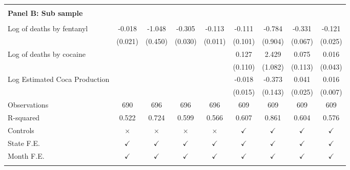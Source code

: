 \begin{tabular}{lcccccccc}
 \hline  & & & & &  &  &  &  \\ \textbf{Panel B: Sub sample} \\ & & & & & & & & \\
\rowcolor{babyblue} Log of deaths by fentanyl&      -0.018         &      -1.048\sym{*}  &      -0.305\sym{***}&      -0.113\sym{***}&      -0.111         &      -0.784         &      -0.331\sym{***}&      -0.121\sym{***}\\
                    &     (0.021)         &     (0.450)         &     (0.030)         &     (0.011)         &     (0.101)         &     (0.904)         &     (0.067)         &     (0.025)         \\
\addlinespace
Log of deaths by cocaine&                     &                     &                     &                     &       0.127         &       2.429\sym{*}  &       0.075         &       0.016         \\
                    &                     &                     &                     &                     &     (0.110)         &     (1.082)         &     (0.113)         &     (0.043)         \\
\addlinespace
Log Estimated Coca Production&                     &                     &                     &                     &      -0.018         &      -0.373\sym{**} &       0.041         &       0.016\sym{**} \\
                    &                     &                     &                     &                     &     (0.015)         &     (0.143)         &     (0.025)         &     (0.007)         \\
\arrayrulecolor{black!10}\midrule
Observations        &         690         &         696         &         696         &         696         &         609         &         609         &         609         &         609         \\
R-squared           &       0.522         &       0.724         &       0.599         &       0.566         &       0.607         &       0.861         &       0.604         &       0.576         \\
Controls            &    $\times$         &    $\times$         &    $\times$         &    $\times$         &$\checkmark$         &$\checkmark$         &$\checkmark$         &$\checkmark$         \\
State F.E.          &$\checkmark$         &$\checkmark$         &$\checkmark$         &$\checkmark$         &$\checkmark$         &$\checkmark$         &$\checkmark$         &$\checkmark$         \\
Month F.E.          &$\checkmark$         &$\checkmark$         &$\checkmark$         &$\checkmark$         &$\checkmark$         &$\checkmark$         &$\checkmark$         &$\checkmark$         \\
\arrayrulecolor{black}\bottomrule
\end{tabular}
